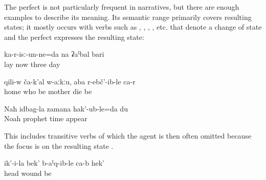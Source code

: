 The perfect is not particularly frequent in narratives, but there are enough examples to describe its meaning. Its semantic range primarily covers resulting states; it mostly occurs with verbs such as , , , , etc. that denote a change of state and the perfect expresses the resulting state:
%
\begin{exe}
	\ex	\label{ex:I have been lying (in the hospital) for three days analytic}
	\gll	ka-r-isː-un-ne=da	na	ʡaˁbal	bari\\
		lay	now	three	day\\
	\glt	{}

	\ex	\label{ex:There is nobody at home, my mother has died analytic}
	\gll	qili-w	ča-k'al	w-aːkːu,	aba	r-ebč'-ib-le	ca-r\\
		home	who	be	mother	die	be\\
	\glt	{}

	\ex	\label{ex:I was born at the time of the prophet Noah}
	\gll	Naħ	idbag-la	zamana	hak'-ub-le=da	du\\
		Noah	prophet	time	appear	\\
	\glt	{}
\end{exe}

This includes transitive verbs of which the agent is then often omitted because the focus is on the resulting state .
%
\begin{exe}
	\ex	\label{ex:Her head has been wounded}
	\gll	ik'-i-la	bek'	b-aˁq-ib-le	ca-b	hek'\\
			head	wound	be	\\
	\glt	{}
\end{exe}

